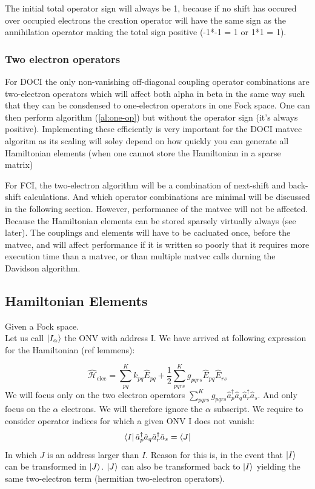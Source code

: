 \documentclass[12p]{article}
\begin{document}
The initial total operator sign will always be 1, because if no shift has occured over occupied electrons the creation operator will have the same sign as the annihilation operator making the total sign positive (-1*-1 = 1 or 1*1 = 1).

\subsubsection{Two electron operators}

For DOCI the only non-vanishing off-diagonal coupling operator combinations are two-electron operators which will affect both alpha in beta in the same way such that they can be consdensed to one-electron operators in one Fock space. One can then perform algorithm (\ref{al:one-op}) but without the operator sign (it's always positive). Implementing these efficiently is very important for the DOCI matvec algoritm as its scaling will soley depend on how quickly you can generate all Hamiltonian elements (when one cannot store the Hamiltonian in a sparse matrix)

For FCI, the two-electron algorithm will be a combination of next-shift and back-shift calculations. And which operator combinations are minimal will be discussed in the following section. However, performance of the matvec will not be affected. Because the Hamiltonian elements can be stored sparsely virtually always (see later). The couplings and elements will have to be cacluated once, before the matvec, and will affect performance if it is written so poorly that it requires more execution time than a matvec, or than multiple matvec calls durning the Davidson algorithm.

\subsection{Hamiltonian Elements}

Given a Fock space.
\\
Let us call $\ket{I_{\alpha}}$ the ONV with address I.
We have arrived at following expression for the Hamiltonian (ref lemmens):

      \begin{equation}\label{eq:ham}
          \hat{\mathcal{H}}_\text{elec} = \sum_{pq}^K k_{pq} \hat{E}_{pq} + \frac{1}{2} \sum_{pqrs}^K g_{pqrs} \hat{E}_{pq} \hat{E}_{rs}
      \end{equation}
We will focus only on the two electron operators $ \sum_{pqrs}^K g_{pqrs} \hat{a}^{\dagger}_{p} \hat{a}_{q}  \hat{a}^{\dagger}_{r} \hat{a}_{s}$. And only focus on the $\alpha$ electrons. We will therefore ignore the $\alpha$ subscript.
We require to consider operator indices for which a given ONV I does not vanish:
\begin{equation} \label{eq:address}
  \bra{I} \hat{a}^{\dagger}_{p} \hat{a}_{q} \hat{a}^{\dagger}_{r} \hat{a}_{s} = \bra{J}
\end{equation}
In which $J$ is an address larger than $I$. Reason for this is, in the event that $\ket{I}$ can be transformed in $\ket{J}$. $\ket{J}$ can also be transformed back to $\ket{I}$ yielding the same two-electron term (hermitian two-electron operators).
\end{document}
